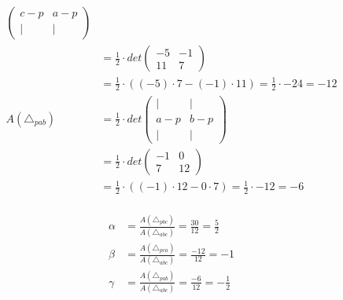 \documentclass{article}
\begin{document}
\[\begin{aligned}
\begin{pmatrix}
                                                         c-p & a-p \\
                                                         |   & |
                                                     \end{pmatrix}                                           \\
                           & = \frac{1}{2} \cdot det \begin{pmatrix}
                                                         -5 & -1 \\
                                                         11 & 7
                                                     \end{pmatrix}                                           \\
                           & = \frac{1}{2} \cdot ((-5) \cdot 7 - (-1) \cdot 11) = \frac{1}{2} \cdot -24 = -12 \\
        A(\triangle_{pab}) & = \frac{1}{2} \cdot det \begin{pmatrix}
                                                         |   & |   \\
                                                         a-p & b-p \\
                                                         |   & |
                                                     \end{pmatrix}                                           \\
                           & = \frac{1}{2} \cdot det \begin{pmatrix}
                                                         -1 & 0  \\
                                                         7  & 12
                                                     \end{pmatrix}                                           \\
                           & = \frac{1}{2} \cdot ((-1) \cdot 12 - 0 \cdot 7) = \frac{1}{2} \cdot -12 = -6     \\
    \end{aligned}
\]

\[
    \begin{aligned}
        \alpha & = \frac{A(\triangle_{pbc})}{A(\triangle_{abc})} = \frac{30}{12} = \frac{5}{2}  \\
        \beta  & = \frac{A(\triangle_{pca})}{A(\triangle_{abc})} = \frac{-12}{12} = -1          \\
        \gamma & = \frac{A(\triangle_{pab})}{A(\triangle_{abc})} = \frac{-6}{12} = -\frac{1}{2} \\
    \end{aligned}
\]
\end{document}
